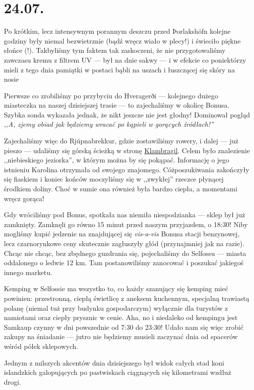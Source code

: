 \chapter*{24.07.}

Po krótkim, lecz intensywnym porannym deszczu przed Þorlakshöfn kolejne godziny były niemal bezwietrznie (bądź wręcz wiało w plecy!) i świeciło piękne słońce (!). Tak\textellipsis byliśmy tym faktem tak zaskoczeni, że nie przygotowaliśmy zawczasu kremu z filtrem UV --- był na dnie sakwy --- i w efekcie co poniektórzy mieli z tego dnia pamiątki w postaci bąbli na uszach i łuszczącej się skóry na nosie\textellipsis


Pierwsze co zrobiliśmy po przybyciu do Hveragerði --- kolejnego dużego miasteczka na naszej dzisiejszej trasie --- to zajechaliśmy w okolicę Bonusa. Szybka sonda wykazała jednak, że nikt jeszcze nie jest głodny! Dominował pogląd \emph{,,A, zjemy obiad jak będziemy wracać po kąpieli w gorących źródłach!''}

Zajechaliśmy więc do Rjúpnabrekkur, gdzie zostawiliśmy rowery, i dalej --- już pieszo --- udaliśmy się górską ścieżką w stronę \href{http://www.vulkaner.no/t/isl2004/hot.html}{Klambragil}. Celem było znalezienie ,,niebieskiego jeziorka'', w którym można by się pokąpać. Informację o jego istnieniu Karolina otrzymała od swojego znajomego. Cóż\textellipsis poszukiwania zakończyły się fiaskiem i koniec końców moczyliśmy się w ,,zwykłej'' rzeczce płynącej środkiem doliny. Choć w sumie ona również była bardzo ciepła, a momentami wręcz gorąca!


Gdy wróciliśmy pod Bonus, spotkała nas niemiła niespodzianka --- sklep był już zamknięty. Zamknęli go równo 15 minut przed naszym przyjazdem, o 18:30! Niby mogliśmy kupić jedzenie na znajdującej się \emph{vis-a-vis} Bonusa stacji benzynowej, lecz czarnorynkowe ceny skutecznie zagłuszyły głód (przynajmniej jak na razie). Chcąc nie chcąc, bez zbędnego guzdrania się, pojechaliśmy do Selfossu --- miasta oddalonego o ledwie 12 km. Tam postanowiliśmy zanocować i poszukać jakiegoś innego marketu.

Kemping w Selfossie ma wszystko to, co każdy szanujący się kemping mieć powinien: przestronną, ciepłą świetlicę z aneksem kuchennym, specjalną trawiastą polanę (niemal tuż przy budynku gospodarczym) wyłącznie dla turystów z namiotami oraz ciepły prysznic w cenie. Aha, no i niedaleko od kempingu jest Samkaup czynny w dni powszednie od 7:30 do 23:30! Udało nam się więc zrobić zakupy na śniadanie --- jutro nie będziemy musieli zaczynać dnia od spacerów wśród półek sklepowych.

Jednym z milszych akcentów dnia dzisiejszego był widok całych stad koni islandzkich galopujących po pastwiskach ciągnących się kilometrami wzdłuż drogi.